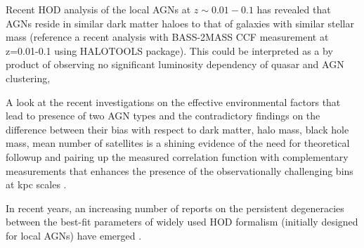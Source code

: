 \documentclass[useAMS,usenatbib]{mn2e}
\begin{document}
Recent HOD analysis of the local AGNs at $z \sim 0.01-0.1$ has revealed that 
AGNs reside in similar dark matter haloes to that of galaxies with similar 
stellar mass (reference a recent analysis with BASS-2MASS CCF measurement at 
z=0.01-0.1 using HALOTOOLS package). 
This could be interpreted as a by product of observing no significant luminosity 
dependency of quasar and AGN clustering,  

A look at the recent investigations on the effective environmental factors that 
lead to presence of two AGN types and the contradictory findings on the 
difference between their bias with respect to dark matter, halo mass, black hole 
mass, mean number of satellites \citep[see, e.g.,][]{Dip14CMB,Dip17a,kr18} is a 
shining evidence of the need for theoretical followup and pairing up the 
measured correlation function with complementary measurements that enhances the 
presence of the observationally challenging bins at kpc scales \citep[see, ][for 
a proposed alternative]{sta11}.

In recent years, an increasing number of reports on the persistent degeneracies 
between the best-fit parameters of widely used HOD formalism (initially 
designed for local AGNs) have emerged \citep{Coi16,coi17}. 
\end{document}
